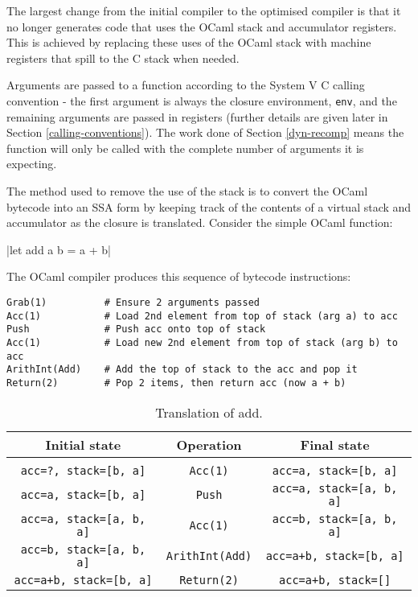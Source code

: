 The largest change from the initial compiler to the optimised compiler is that it no longer
generates
code that uses the OCaml stack and accumulator registers. This is achieved by replacing these uses
of the OCaml stack with machine registers that spill to the C stack when needed.

Arguments are passed to a function according to the System V C calling convention - the first
argument is always the closure environment, \texttt{env}, and the remaining arguments are passed
in registers (further details are given later in Section \ref{calling-conventions}). The work done
of Section \ref{dyn-recomp} means the function will only be called with the complete number of
arguments it is expecting.

The method used to remove the use of the stack is to convert the OCaml bytecode into an SSA form
by keeping track of the contents of a virtual stack and accumulator as the closure is translated.
Consider the simple OCaml function:

|let add a b = a + b|

The OCaml compiler produces this sequence of bytecode instructions:

\begin{verbatim}
Grab(1)          # Ensure 2 arguments passed
Acc(1)           # Load 2nd element from top of stack (arg a) to acc
Push             # Push acc onto top of stack
Acc(1)           # Load new 2nd element from top of stack (arg b) to acc
ArithInt(Add)    # Add the top of stack to the acc and pop it
Return(2)        # Pop 2 items, then return acc (now a + b)
\end{verbatim}

\begin{table}[h]
      \centering
      \begin{tabular}{ccc}\toprule
            Initial state                   & Operation              & Final state
            \\
            \midrule
            \\
            \texttt{acc=?, stack=[b, a]}    & \texttt{Acc(1)}        & \texttt{acc=a, stack=[b, a]}
            \\
            \texttt{acc=a, stack=[b, a]}    & \texttt{Push}          & \texttt{acc=a, stack=[a, b,
                              a]}
            \\
            \texttt{acc=a, stack=[a, b, a]} & \texttt{Acc(1)}        & \texttt{acc=b, stack=[a, b,
                              a]}
            \\
            \texttt{acc=b, stack=[a, b, a]} & \texttt{ArithInt(Add)} & \texttt{acc=a+b, stack=[b,
                              a]}
            \\
            \texttt{acc=a+b, stack=[b, a]}  & \texttt{Return(2)}     & \texttt{acc=a+b, stack=[]}
            \\
            \bottomrule
      \end{tabular}

      \caption{Translation of add.}
      \label{table:stacktrans}
\end{table}

